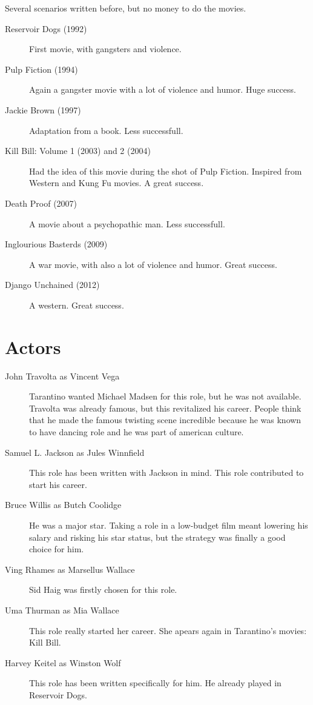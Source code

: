 \documentclass[a4paper,12pt]{article}
\begin{document}
Several scenarios written before, but no money to do the movies.

\begin{description}
    \item[Reservoir Dogs (1992)] First movie, with gangsters and violence.
    \item[Pulp Fiction (1994)] Again a gangster movie with a lot of violence and humor. Huge success.
    \item[Jackie Brown (1997)] Adaptation from a book. Less successfull.
    \item[Kill Bill: Volume 1 (2003) and 2 (2004)] Had the idea of this movie during the shot of Pulp Fiction. Inspired from Western and Kung Fu movies. A great success.
    \item[Death Proof (2007)] A movie about a psychopathic man. Less successfull.
    \item[Inglourious Basterds (2009)] A war movie, with also a lot of violence and humor. Great success.
    \item[Django Unchained (2012)] A western. Great success.
\end{description}

\section{Actors}

\begin{description}
    \item[John Travolta as Vincent Vega] Tarantino wanted Michael Madsen for this
role, but he was not available. Travolta was already famous, but this revitalized
his career. People think that he made the famous twisting scene incredible because
he was known to have dancing role and he was part of american culture.
    \item[Samuel L. Jackson as Jules Winnfield] This role has been written with
Jackson in mind. This role contributed to start his career.
    \item[Bruce Willis as Butch Coolidge] He was a major star. Taking a role in
a low-budget film meant lowering his salary and risking his star status, but the
strategy was finally a good choice for him.
    \item[Ving Rhames as Marsellus Wallace] Sid Haig was firstly chosen for this
role.
    \item[Uma Thurman as Mia Wallace] This role really started her career. She
apears again in Tarantino's movies: Kill Bill.
    \item[Harvey Keitel as Winston Wolf] This role has been written specifically
for him. He already played in Reservoir Dogs.
\end{description}
\end{document}
